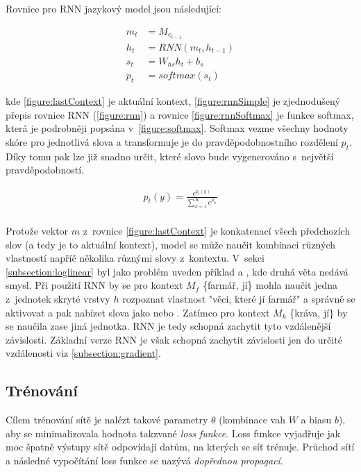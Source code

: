 Rovnice pro RNN jazykový model jsou následující:

\begin{align}
  m_{t}&=M_{e_{t-1}}\label{figure:lastContext} \\
  h_{t}&=RNN(m_t, h_{t-1}) \label{figure:rnnSimple} \\
  s_{t}&=W_{hs}h_t + b_s \label{figure:rnnSt} \\
  p_{t}&=softmax(s_t) \label{figure:rnnSoftmax}
\end{align}


kde \ref{figure:lastContext} je aktuální kontext, \ref{figure:rnnSimple} je zjednodušený přepis rovnice RNN (\ref{figure:rnn}) a rovnice \ref{figure:rnnSoftmax} je funkce softmax, která je podrobněji popsána v~\ref{figure:softmax}. Softmax vezme všechny hodnoty skóre pro jednotlivá slova a transformuje je do pravděpodobnostního rozdělení $p_t$. Díky tomu pak lze již snadno určit, které slovo bude vygenerováno s~největší pravděpodobností.


\begin{align}\label{figure:softmax}
  p_t(y)={\frac {e^{p_{t}(y)}}{\sum _{k=1}^{K}e^{p_{t_{k}}}}}
\end{align}
\\


Protože vektor $m$ z~rovnice \ref{figure:lastContext} je konkatenací všech předchozích slov (a tedy je to aktuální kontext), model se může naučit kombinaci různých vlastností napříč několika různými slovy z~kontextu. V~sekci \ref{subsection:loglinear} byl jako problém uveden příklad  a , kde druhá věta nedává smysl. Při použití RNN by se pro kontext $M_f$  \{farmář, jí\} mohla naučit jedna z~jednotek skryté vrstvy $h$ rozpoznat vlastnost "věci, které jí farmář" a správně se aktivovat a pak nabízet slova jako  nebo . Zatímco pro kontext $M_k$ \{kráva, jí\} by se naučila zase jiná jednotka. RNN je tedy schopná zachytit tyto vzdálenější závislosti. Základní verze RNN je však schopná zachytit závislosti jen do určité vzdálenosti viz \ref{subsection:gradient}.


\subsection{Trénování} \label{subsection:training}
Cílem trénování sítě je nalézt takové parametry $\theta$ (kombinace vah $W$ a biasu $b$), aby se minimalizovala hodnota takzvané \emph{loss funkce}. Loss funkce vyjadřuje jak moc špatně výstupy sítě odpovídají datům, na kterých se síť trénuje. Průchod sítí a následné vypočítání loss funkce se nazývá \emph{dopřednou propagací}.


